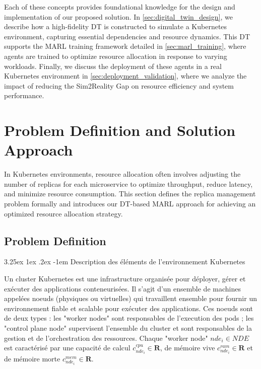 \documentclass[conference]{IEEEtran}
\makeatletter
\renewcommand\paragraph{\@startsection{paragraph}{5}{\z@}%
  {3.25ex \@plus1ex \@minus.2ex}%
  {-1em}%
  {\normalfont\normalsize\bfseries}}
\makeatother
\begin{document}
Each of these concepts provides foundational knowledge for the design and implementation of our proposed solution. In \autoref{sec:digital_twin_design}, we describe how a high-fidelity DT is constructed to simulate a Kubernetes environment, capturing essential dependencies and resource dynamics. This DT supports the MARL training framework detailed in \autoref{sec:marl_training}, where agents are trained to optimize resource allocation in response to varying workloads. Finally, we discuss the deployment of these agents in a real Kubernetes environment in \autoref{sec:deployment_validation}, where we analyze the impact of reducing the Sim2Reality Gap on resource efficiency and system performance.


\section{Problem Definition and Solution Approach}
\label{sec:problem_definition_solution}
In Kubernetes environments, resource allocation often involves adjusting the number of replicas for each microservice to optimize throughput, reduce latency, and minimize resource consumption. This section defines the replica management problem formally and introduces our DT-based MARL approach for achieving an optimized resource allocation strategy.

\subsection{Problem Definition}

\paragraph{Description des éléments de l'environnement Kubernetes}

Un cluster Kubernetes est une infrastructure organisée pour déployer, gérer et exécuter des applications conteneurisées. Il s'agit d'un ensemble de machines appelées noeuds (physiques ou virtuelles) qui travaillent ensemble pour fournir un environnement fiable et scalable pour exécuter des applications.
Ces noeuds sont de deux types : les "worker nodes" sont responsables de l'execution des pods ; les "control plane node" supervisent l'ensemble du cluster et sont responsables de la gestion et de l'orchestration des ressources. Chaque "worker node" $nde_i \in NDE$ est caractérisé par une capacité de calcul $c^{cpu}_{nde_i} \in \mathbf{R}$, de mémoire vive $c^{ram}_{nde_i} \in \mathbf{R}$ et de mémoire morte $c^{mem}_{nde_i} \in \mathbf{R}$.
\end{document}
